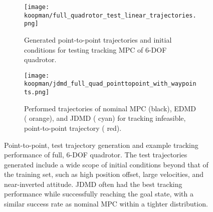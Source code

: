 \documentclass[../root.tex]{subfiles}
\begin{document}
\begin{figure}[t] \centering
	\begin{subfigure}[t]{0.49\textwidth}
		\centering
		\texttt{[image: koopman/full\_quadrotor\_test\_linear\_trajectories.png]}
		\caption{Generated point-to-point trajectories and initial conditions for testing
		tracking MPC of 6-DOF quadrotor.}
		\label{fig:rex_full_quadrotor_initial_conditions}
	\end{subfigure}
	\hfill
	\begin{subfigure}[t]{0.49\textwidth}
		\raggedright
		\texttt{[image: koopman/jdmd\_full\_quad\_pointtopoint\_with\_waypoints.png]}
		\caption{Performed trajectories of nominal MPC (black), EDMD (\color{orange}
		orange\color{black}), and JDMD (\color{cyan} cyan\color{black}) for tracking infeasible,
		point-to-point trajectory (\color{red} red\color{black}).}
		\label{fig:jdmd_full_quad_pointtopoint_with_waypoints}
	\end{subfigure}
	\caption{Point-to-point, test trajectory generation and example tracking performance of full, 6-DOF quadrotor. The test                trajectories generated include a wide scope of initial conditions beyond that of the training set, such as high                 position offset, large velocities, and near-inverted attitude. JDMD often had the best tracking performance while               successfully reaching the goal state, with a similar success rate as nominal MPC within a tighter distribution. 
	}
	\label{fig:training_window}
\end{figure}


\end{document}
